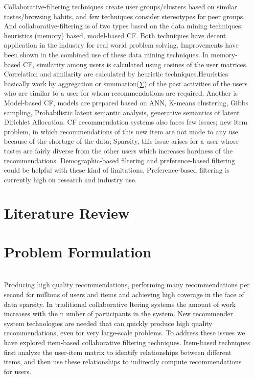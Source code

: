 \documentclass[10pt,a4paper]{article}
\begin{document}
Collaborative-filtering techniques create user groups/clusters based on similar tastes/browsing habits,
and few techniques consider stereotypes for peer groups. And collaborative-filtering is of two types
based on the data mining techniques; heuristics (memory) based, model-based CF. Both techniques
have decent application in the industry for real world problem solving. Improvements have been
shown in the combined use of these data mining techniques.
In memory-based CF, similarity among users is calculated using cosines of the user matrices.
Correlation and similarity are calculated by heuristic techniques.Heuristics basically work by
aggregation or summation(∑) of the past activities of the users who are similar to a user for whom
recommendations are required. Another is Model-based CF, models are prepared based on ANN,
K-means clustering, Gibbs sampling, Probabilistic latent semantic analysis, generative semantics of
latent Dirichlet Allocation. CF recommendation systems also faces few issues; new item problem, in
which recommendations of this new item are not made to any use because of the shortage of the data;
Sparsity, this issue arises for a user whose tastes are fairly diverse from the other users which
increases hardness of the recommendations. Demographic-based filtering and preference-based
filtering could be helpful with these kind of limitations. Preference-based filtering is currently high
on research and industry use.\\

	\section{Literature Review}

	\section{Problem Formulation}

	\textbf{}	\\Producing high quality recommendations, performing many recommendations per second for millions of users and items and achieving high coverage in the face of data sparsity. In traditional collaborative ltering systems the amount of work increases with the n umber of participants in the system. New recommender system technologies are needed that can quickly produce high quality recommendations, even for very large-scale problems. To address these issues we have explored item-based collaborative filtering techniques. Item-based techniques first analyze the user-item matrix to identify relationships between different items, and then use these relationships to indirectly compute recommendations for users. 
\end{document}
